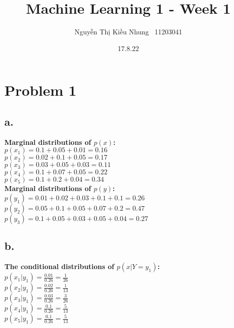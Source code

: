 \documentclass{article}
\title{Machine Learning 1 - Week 1 }
\author{Nguyễn Thị Kiều Nhung \ 11203041}
\date{17.8.22}
\begin{document}
\maketitle

\section*{Problem 1}
\subsection*{a.}
\textbf{Marginal distributions of $p(x)$:} \\

$p(x_1) = 0.1 + 0.05 + 0.01 = 0.16 $ \\
$p(x_2) = 0.02 + 0.1 + 0.05 = 0.17 $ \\
$p(x_3) = 0.03 + 0.05 + 0.03 = 0.11 $ \\
$p(x_4) = 0.1 + 0.07 + 0.05 = 0.22 $ \\
$p(x_5) = 0.1 + 0.2 + 0.04 = 0.34 $ \\

\textbf{Marginal distributions of $p(y)$:} \\

$p(y_1) = 0.01 + 0.02 + 0.03 + 0.1 + 0.1 = 0.26 $\\
$p(y_2) = 0.05 + 0.1 + 0.05 + 0.07 + 0.2 = 0.47 $ \\
$p(y_3) = 0.1 + 0.05 + 0.03 + 0.05 + 0.04 = 0.27 $ \\ 

\subsection*{b.}
\textbf{The conditional distributions of $p(x|Y = y_1)$:} \\

$p(x_1|y_1) = \frac{0.01}{0.26} = \frac{1}{26}$\\

$p(x_2|y_1) = \frac{0.02}{0.26} = \frac{1}{13}$ \\

$p(x_3|y_1) = \frac{0.03}{0.26} = \frac{3}{26}$\\

$p(x_4|y_1) = \frac{0.1}{0.26} = \frac{5}{13}$\\

$p(x_5|y_1) = \frac{0.1}{0.26} = \frac{5}{13}$\\
\end{document}
